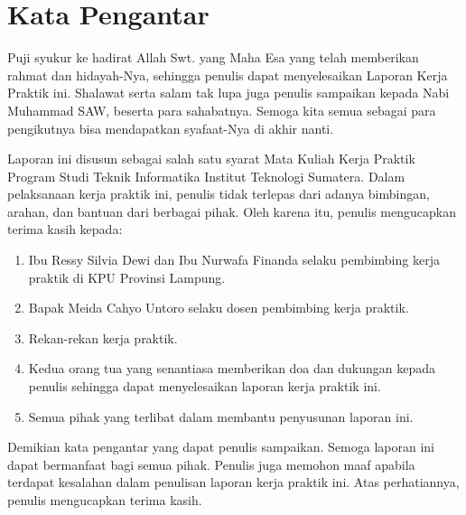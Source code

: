 \section*{\centering Kata Pengantar}

\setcounter{page}{5}

\indent Puji syukur ke hadirat Allah Swt. yang Maha Esa yang telah memberikan rahmat dan hidayah-Nya, sehingga penulis dapat menyelesaikan Laporan Kerja Praktik ini. Shalawat serta salam tak lupa juga penulis sampaikan kepada Nabi Muhammad SAW, beserta para sahabatnya. Semoga kita semua sebagai para pengikutnya bisa mendapatkan syafaat-Nya di akhir nanti. 

Laporan ini disusun sebagai salah satu syarat Mata Kuliah Kerja Praktik Program Studi Teknik Informatika Institut Teknologi Sumatera. Dalam pelaksanaan kerja praktik ini, penulis tidak terlepas dari adanya bimbingan, arahan, dan bantuan dari berbagai pihak. Oleh karena itu, penulis mengucapkan terima kasih kepada:

\begin{enumerate}
    \item Ibu Ressy Silvia Dewi dan Ibu Nurwafa Finanda selaku pembimbing kerja praktik di KPU Provinsi Lampung.
    \item Bapak Meida Cahyo Untoro selaku dosen pembimbing kerja praktik.
    \item Rekan-rekan kerja praktik.
    \item Kedua orang tua yang senantiasa memberikan doa dan dukungan kepada penulis sehingga dapat menyelesaikan laporan kerja praktik ini.
    \item Semua pihak yang terlibat dalam membantu penyusunan laporan ini.
\end{enumerate}

Demikian kata pengantar yang dapat penulis sampaikan. Semoga laporan ini dapat bermanfaat bagi semua pihak. Penulis juga memohon maaf apabila terdapat kesalahan dalam penulisan laporan kerja praktik ini. Atas perhatiannya, penulis mengucapkan terima kasih.

\newpage